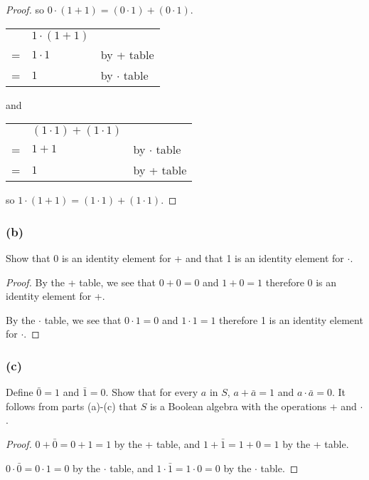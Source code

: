 \documentclass[14pt]{extarticle}
\newcommand{\cy}{\color{cyan}}
\begin{document}
\begin{proof}
  so \(0 \cdot (1 + 1) = (0 \cdot 1) + (0 \cdot 1)\).

  \begin{tabular}{cll}
      & \(1 \cdot (1 + 1)\) &                        \\
    = & \(1 \cdot 1\)       & {\cy by + table}       \\
    = & \(1\)               & {\cy by $\cdot$ table}
  \end{tabular}
  and
  \begin{tabular}{cll}
      & \((1 \cdot 1) + (1 \cdot 1)\) &                        \\
    = & \(1 + 1\)                     & {\cy by $\cdot$ table} \\
    = & \(1\)                         & {\cy by + table}
  \end{tabular}

  so \(1 \cdot (1 + 1) = (1 \cdot 1) + (1 \cdot 1)\).
\end{proof}

\subsubsection{(b)}
Show that 0 is an identity element for + and that 1 is an identity element for $\cdot$.

\begin{proof}
  By the + table, we see that $0 + 0 = 0$ and $1 + 0 = 1$ therefore 0 is an identity element for +.

  By the $\cdot$ table, we see that $0 \cdot 1 = 0$ and $1 \cdot 1 = 1$ therefore 1 is an identity element for $\cdot$.
\end{proof}

\subsubsection{(c)}
Define \(\bar{0} = 1\) and \(\bar{1} = 0\). Show that for every $a$ in $S$, \(a + \bar{a} = 1\) and
\(a \cdot \bar{a} = 0\). It follows from parts (a)-(c) that $S$ is a Boolean algebra with the operations + and $\cdot$.

\begin{proof}
  \(0 + \bar{0} = 0 + 1 = 1\) by the + table, and \(1 + \bar{1} = 1 + 0 = 1\) by the + table.

  \(0 \cdot \bar{0} = 0 \cdot 1 = 0\) by the $\cdot$ table, and \(1 \cdot \bar{1} = 1 \cdot 0 = 0\) by the $\cdot$ table.
\end{proof}
\end{document}
